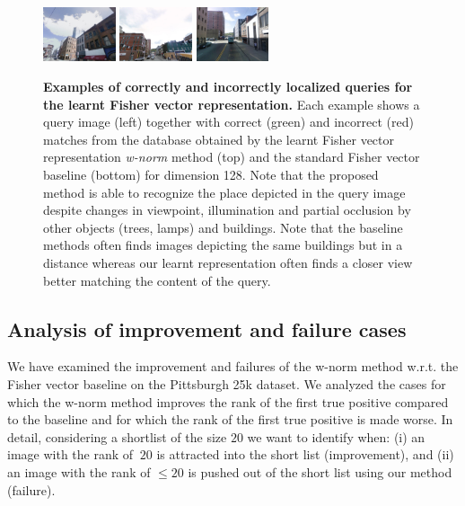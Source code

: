 \begin{figure}[h]
\begin{minipage}{0.75\linewidth}
\begin{minipage}{\linewidth}
              \colorbox{myGreen}{\includegraphics[height=16mm]{imgs/ex4/FV2.jpg}}
              \colorbox{myRed}{\includegraphics[height=16mm]{imgs/ex4/FV3.jpg}}
              \colorbox{myRed}{\includegraphics[height=16mm]{imgs/ex4/FV4.jpg}}
          \end{minipage} 
      \end{minipage}
      \caption{
          \textbf{Examples of correctly and incorrectly localized queries for the learnt Fisher vector representation.}
          Each example shows a query image (left) together with correct (green) and incorrect (red) matches from the database obtained by the learnt Fisher vector representation \emph{w-norm} method (top) and the standard Fisher vector baseline (bottom) for dimension 128. Note that the proposed method is able to recognize the place depicted in the query image despite changes in viewpoint, illumination and partial occlusion by other objects (trees, lamps) and buildings. 
          Note that the baseline methods often finds images depicting the same buildings but in a distance whereas our learnt representation often finds a closer view better matching the content of the query.        
      }
      \label{fig:images_bow}
    \end{figure}


  \subsection{{Analysis of improvement and failure cases}}
  \label{sec:failures}

      We have examined the improvement and failures of the w-norm method w.r.t. the Fisher vector baseline on the Pittsburgh 25k dataset. We analyzed the cases for which the w-norm method improves the rank of the first true positive compared to the baseline and for which the rank of the first true positive is made worse. In detail, considering a shortlist of the size $20$ we want to identify when: (i) an image with the rank of $\> 20$ is attracted into the short list (improvement), and (ii) an image with the rank of $\leq 20$ is pushed out of the short list using our method (failure).



